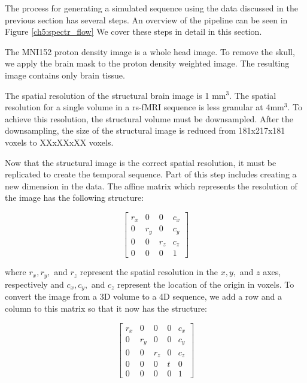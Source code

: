 The process for generating a simulated sequence using the data discussed in the previous section has several steps. An overview of the pipeline can be seen in Figure \ref{ch5:spectr_flow} We cover these steps in detail in this section.

The MNI152 proton density image is a whole head image. To remove the skull, we apply the brain mask to the proton density weighted image. The resulting image contains only brain tissue.

The spatial resolution of the structural brain image is 1 mm$^3$. The spatial resolution for a single volume in a rs-fMRI sequence is less granular at 4mm$^3$. To achieve this resolution, the structural volume must be downsampled. After the downsampling, the size of the structural image is reduced from 181x217x181 voxels to XXxXXxXX voxels. %

Now that the structural image is the correct spatial resolution, it must be replicated to create the temporal sequence. Part of this step includes creating a new dimension in the data. The affine matrix which represents the resolution of the image has the following structure:

\begin{equation}
\begin{bmatrix}
 r_x &  0   &  0   & c_x\\ 
 0   &  r_y &  0   & c_y \\ 
 0   &  0   &  r_z & c_z \\ 
 0   &  0   &  0   & 1 
\end{bmatrix}
\end{equation}

\noindent where $r_x, r_y,$ and $r_z$ represent the spatial resolution in the $x, y,$ and $z$ axes, respectively and $c_x, c_y,$ and $c_z$ represent the location of the origin in voxels. To convert the image from a 3D volume to a 4D sequence, we add a row and a column to this matrix so that it now has the structure:

\begin{equation}
\begin{bmatrix}
 r_x &  0   &  0   & 0 & c_x\\ 
 0   &  r_y &  0   & 0 & c_y \\ 
 0   &  0   &  r_z & 0 & c_z \\ 
 0   &  0   &  0   & t & 0 \\
 0   &  0   &  0   & 0 & 1 
\end{bmatrix}
\end{equation}

